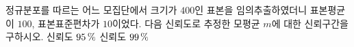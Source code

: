 정규분포를 따르는 어느 모집단에서 크기가 $400$인 표본을 임의추출하였더니 표본평균이 $100$, 표본표준편차가 $10$이었다. 다음 신뢰도로 추정한 모평균 $m$에 대한 신뢰구간을 구하시오. 
 신뢰도 $95\mkern3mu \%$
 신뢰도 $99\mkern3mu \%$
